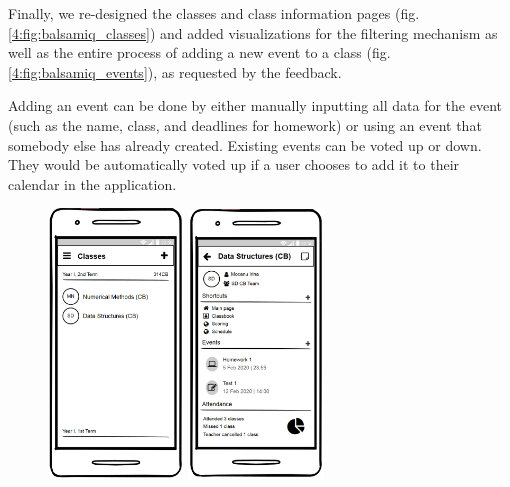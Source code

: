Finally, we re-designed the classes and class information pages (fig. \ref{4:fig:balsamiq_classes}) and added visualizations for the filtering mechanism as well as the entire process of adding a new event to a class (fig. \ref{4:fig:balsamiq_events}), as requested by the feedback.

Adding an event can be done by either manually inputting all data for the event (such as the name, class, and deadlines for homework) or using an event that somebody else has already created. Existing events can be voted up or down. They would be automatically voted up if a user chooses to add it to their calendar in the application.

\clearpage

\begin{figure}[!ht]
    \centering
     \includegraphics[width=0.32\textwidth]{figures/app/balsamiq/classes.png}
     \hfill
     \includegraphics[width=0.32\textwidth]{figures/app/balsamiq/class_info.png}

\end{figure}
